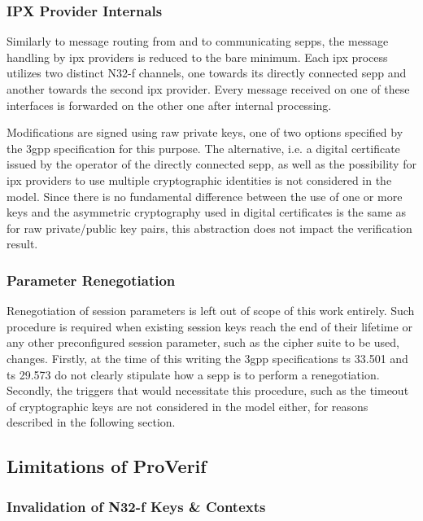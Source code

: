 \subsubsection{IPX Provider Internals}

Similarly to message routing from and to communicating \glspl{sepp}, the message handling by \gls{ipx} providers is reduced to the bare minimum.
Each \gls{ipx} process utilizes two distinct N32-f channels, one towards its directly connected \gls{sepp} and another towards the second \gls{ipx} provider.
Every message received on one of these interfaces is forwarded on the other one after internal processing.

Modifications are signed using raw private keys, one of two options specified by the \gls{3gpp} specification for this purpose.
The alternative, i.e. a digital certificate issued by the operator of the directly connected \gls{sepp}, as well as the possibility for \gls{ipx} providers to use multiple cryptographic identities is not considered in the model.
Since there is no fundamental difference between the use of one or more keys and the asymmetric cryptography used in digital certificates is the same as for raw private/public key pairs, this abstraction does not impact the verification result.

\subsubsection{Parameter Renegotiation}

Renegotiation of session parameters is left out of scope of this work entirely.
Such procedure is required when existing session keys reach the end of their lifetime or any other preconfigured session parameter, such as the cipher suite to be used, changes.
Firstly, at the time of this writing the \gls{3gpp} specifications \gls{ts} 33.501 and \gls{ts} 29.573 do not clearly stipulate how a \gls{sepp} is to perform a renegotiation.
Secondly, the triggers that would necessitate this procedure, such as the timeout of cryptographic keys are not considered in the model either, for reasons described in the following section.

\subsection{Limitations of ProVerif}

\subsubsection{Invalidation of N32-f Keys \& Contexts}

